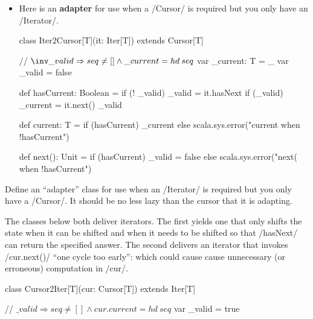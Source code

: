 \documentclass{ip3}
\begin{document}
\begin{foil}
\begin{itemize}
\item Here is an \textbf{adapter} for use when a \sc/Cursor/ is required but you only have an
\sc/Iterator/.

\begin{-code}
        
        class Iter2Cursor[T](it: Iter[T]) extends Cursor[T] {
          // $\inv \_valid \Rightarrow  seq\not=[] \land \_current=hd\:seq$
          var _current: T = _
          var _valid      = false
          
          def hasCurrent: Boolean = 
          {   if (! _valid) {
                 _valid   = it.hasNext
                 if (_valid) _current = it.next()
              }
              _valid
          }
          
          def current: T = if (hasCurrent)
                              _current 
                           else 
                              scala.sys.error("current when !hasCurrent")
          
          def next(): Unit = if (hasCurrent) 
                                _valid = false 
                             else 
                                scala.sys.error("next( when !hasCurrent")       
        }
\end{-code}
\end{itemize}
\begin{exercise}
Define an ``adapter'' class for use when an \sc/Iterator/ is required but you only have a
\sc/Cursor/. It should be no less lazy than the cursor that it is adapting.
\begin{answer}
The classes below both deliver iterators. The first
yields one that only shifts the state when it can be shifted and
when it needs to be shifted so that \sc/hasNext/ can return 
the specified answer. The second delivers an iterator that
invokes \sc/cur.next()/ ``one cycle too early'': which could 
cause cause unnecessary (or erroneous) computation in \sc/cur/.
\begin{--code}
     class Cursor2Iter[T](cur: Cursor[T]) extends Iter[T] {
         // $\_valid \Rightarrow seq\not=[] \land cur.current=hd\:seq$
         var _valid = true

}
\end{--code}
\end{answer}
\end{exercise}
\end{foil}
\end{document}
